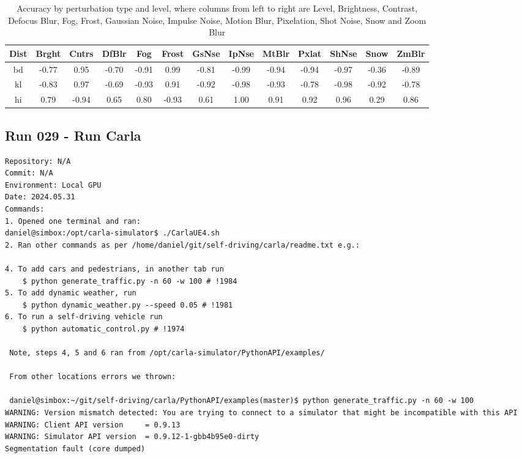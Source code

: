 \begin{table}[ht]
\centering
\begin{tabular}{|c|c|c|c|c|c|c|c|c|c|c|c|c|}
\hline
Dist & Brght & Cntrs & DfBlr & Fog & Frost & GsNse & IpNse & MtBlr & Pxlat & ShNse & Snow & ZmBlr \\
\hline
bd & -0.77 & 0.95 & -0.70 & -0.91 & 0.99 & -0.81 & -0.99 & -0.94 & -0.94 & -0.97 & -0.36 & -0.89 \\
kl & -0.83 & 0.97 & -0.69 & -0.93 & 0.91 & -0.92 & -0.98 & -0.93 & -0.78 & -0.98 & -0.92 & -0.78 \\
hi & 0.79 & -0.94 & 0.65 & 0.80 & -0.93 & 0.61 & 1.00 & 0.91 & 0.92 & 0.96 & 0.29 & 0.86 \\
\hline
\end{tabular}
\caption{Accuracy by perturbation type and level, where columns from left to right are Level, Brightness, Contrast, Defocus Blur, Fog, Frost, Gaussian Noise, Impulse Noise, Motion Blur, Pixelation, Shot Noise, Snow and Zoom Blur}
\label{CorrelationAccuracyvsnoiselevelsforallnoisetypes}
\end{table}

\subsection{Run 029 - Run Carla }
\label{app_res:029}
\begin{verbatim}
Repository: N/A
Commit: N/A
Environment: Local GPU
Date: 2024.05.31
Commands: 
1. Opened one terminal and ran:
daniel@simbox:/opt/carla-simulator$ ./CarlaUE4.sh
2. Ran other commands as per /home/daniel/git/self-driving/carla/readme.txt e.g.:

4. To add cars and pedestrians, in another tab run
	$ python generate_traffic.py -n 60 -w 100 # !1984
5. To add dynamic weather, run
	$ python dynamic_weather.py --speed 0.05 # !1981
6. To run a self-driving vehicle run
	$ python automatic_control.py # !1974

 Note, steps 4, 5 and 6 ran from /opt/carla-simulator/PythonAPI/examples/

 From other locations errors we thrown:

 daniel@simbox:~/git/self-driving/carla/PythonAPI/examples(master)$ python generate_traffic.py -n 60 -w 100
WARNING: Version mismatch detected: You are trying to connect to a simulator that might be incompatible with this API 
WARNING: Client API version     = 0.9.13 
WARNING: Simulator API version  = 0.9.12-1-gbb4b95e0-dirty 
Segmentation fault (core dumped)

\end{verbatim}

